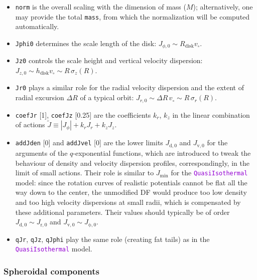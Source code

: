 \documentclass[12pt]{article}
\newcommand{\ttt}[1]{\textcolor{darkviolet}{\texttt{#1}}}
\newcommand{\ppp}[1]{\textcolor{darkolive} {\texttt{#1}}}
\begin{document}
\begin{itemize}
\item \ppp{norm} is the overall scaling with the dimension of mass ($M$); alternatively, one may provide the total \ppp{mass}, from which the normalization will be computed automatically.
\item \ppp{Jphi0} determines the scale length of the disk: $J_{\phi,0} \sim R_\mathrm{disk}v_\circ$.
\item \ppp{Jz0} controls the scale height and vertical velocity dispersion: $J_{z,0} \sim h_\mathrm{disk}v_\circ \sim R\,\sigma_z(R)$.
\item \ppp{Jr0} plays a similar role for the radial velocity dispersion and the extent of radial excursion $\Delta R$ of a typical orbit: $J_{r,0} \sim \Delta R\,v_\circ \sim R\,\sigma_r(R)$.
\item \ppp{coefJr} [1], \ppp{coefJz} [0.25] are the coefficients $k_r$, $k_z$ in the linear combination of actions $\tilde J \equiv |J_\phi| + k_r J_r + k_z J_z$.
\item \ppp{addJden} [0] and \ppp{addJvel} [0] are the lower limits $J_\mathrm{d,0}$ and $J_\mathrm{v,0}$ for the arguments of the $q$-exponential functions, which are introduced to tweak the behaviour of density and velocity dispersion profiles, correspondingly, in the limit of small actions. Their role is similar to $J_\mathrm{min}$ for the \ttt{QuasiIsothermal} model: since the rotation curves of realistic potentials cannot be flat all the way down to the center, the unmodified DF would produce too low density and too high velocity dispersions at small radii, which is compensated by these additional parameters. Their values should typically be of order $J_\mathrm{d,0} \sim J_\mathrm{r,0}$ and $J_\mathrm{v,0} \sim J_\mathrm{\phi,0}$.
\item \ppp{qJr}, \ppp{qJz}, \ppp{qJphi} play the same role (creating fat tails) as in the \ttt{QuasiIsothermal} model.
\end{itemize}


\subsubsection{Spheroidal components}  \label{sec:DFspheroid}
\end{document}
